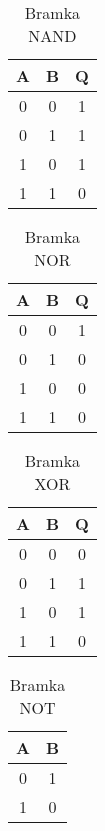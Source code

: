 \documentclass[12pt, letterpaper, titlepage]{article}
\begin{document}
\begin{table}[h]
\centering\caption{Bramka NAND}

\begin{tabular}{c c| c}

A & B & Q \\
 \hline
0 & 0 & 1\\
0 & 1 & 1\\
1 & 0 & 1\\
1 & 1 & 0\\
\end{tabular}
\end{table}

\begin{table}[h]
\centering\caption{Bramka NOR}

\begin{tabular}{c c| c}

A & B & Q \\
 \hline
0 & 0 & 1\\
0 & 1 & 0\\
1 & 0 & 0\\
1 & 1 & 0\\
\end{tabular}
\end{table}

\begin{table}[h]
\centering\caption{Bramka XOR}

\begin{tabular}{c c| c}
 
A & B & Q \\
 \hline
0 & 0 & 0\\
0 & 1 & 1\\
1 & 0 & 1\\
1 & 1 & 0\\
\end{tabular}
\end{table}

\begin{table}[h]
\centering\caption{Bramka NOT}

\begin{tabular}{c| c}

A & B  \\
 \hline
0 & 1  \\
1 & 0 \\

\end{tabular}
\end{table}
\end{document}
